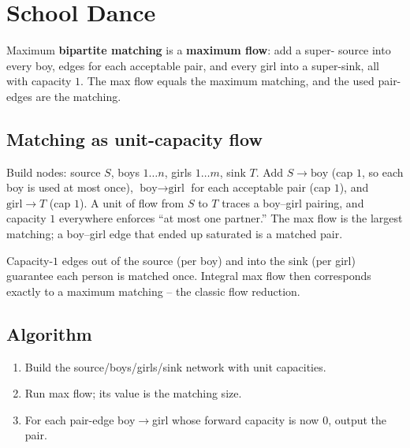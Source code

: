 \section{School Dance}
\label{sec:cses-school-dance}


\begin{patternbox}
Maximum \textbf{bipartite matching} is a \textbf{maximum flow}: add a super-
source into every boy, edges for each acceptable pair, and every girl into a
super-sink, all with capacity $1$. The max flow equals the maximum matching,
and the used pair-edges are the matching.
\end{patternbox}

\subsection*{Matching as unit-capacity flow}

Build nodes: source $S$, boys $1\ldots n$, girls $1\ldots m$, sink $T$. Add
$S\to\text{boy}$ (cap $1$, so each boy is used at most once),
$\text{boy}\to\text{girl}$ for each acceptable pair (cap $1$), and
$\text{girl}\to T$ (cap $1$). A unit of flow from $S$ to $T$ traces a
boy--girl pairing, and capacity $1$ everywhere enforces ``at most one
partner.'' The max flow is the largest matching; a boy--girl edge that ended
up saturated is a matched pair.

\begin{ideabox}
Capacity-$1$ edges out of the source (per boy) and into the sink (per girl)
guarantee each person is matched once. Integral max flow then corresponds
exactly to a maximum matching -- the classic flow reduction.
\end{ideabox}

\subsection*{Algorithm}

\begin{enumerate}
  \item Build the source/boys/girls/sink network with unit capacities.
  \item Run max flow; its value is the matching size.
  \item For each pair-edge boy$\to$girl whose forward capacity is now $0$,
        output the pair.
\end{enumerate}

